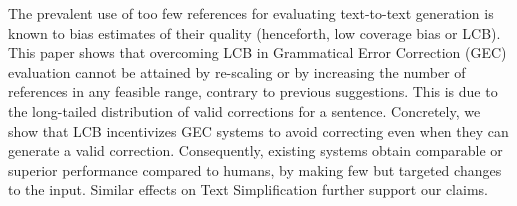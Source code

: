 The prevalent use of too few references for evaluating text-to-text generation is known to bias estimates of their quality (henceforth, low coverage bias or LCB). This paper shows that overcoming LCB in Grammatical Error Correction (GEC) evaluation cannot be attained by re-scaling or by increasing the number of references in any feasible range, contrary to previous suggestions. This is due to the long-tailed distribution of valid corrections for a sentence. Concretely, we show that LCB incentivizes GEC systems to avoid correcting even when they can generate a valid correction. Consequently, existing systems obtain comparable or superior performance compared to humans, by making few but targeted changes to the input. Similar effects on Text Simplification further support our claims.

